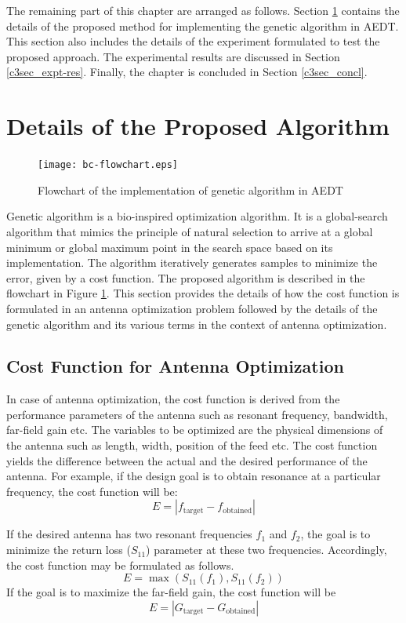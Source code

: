 The remaining part of this chapter are arranged as follows. Section \ref{c3sec-prop-alg} contains the details of the proposed method for implementing the genetic algorithm in AEDT. This section also includes the details of the experiment formulated to test the proposed approach. The experimental results are discussed in Section \ref{c3sec_expt-res}. Finally, the chapter is concluded in Section \ref{c3sec_concl}.

\section{Details of the Proposed Algorithm} \label{c3sec-prop-alg}
\begin{figure}
  \centering
  \texttt{[image: bc-flowchart.eps]}\\
  \caption{Flowchart of the implementation of genetic algorithm in AEDT}\label{fig_3_1}
\end{figure}
Genetic algorithm is a bio-inspired optimization algorithm. It is a global-search algorithm that mimics the principle of natural selection to arrive at a global minimum or global maximum point in the search space based on its implementation. The algorithm iteratively generates samples to minimize the error, given by a cost function. The proposed algorithm is described in the flowchart in Figure \ref{fig_3_1}. This section provides the details of how the cost function is formulated in an antenna optimization problem followed by the details of the genetic algorithm and its various terms in the context of antenna optimization.

\subsection{Cost Function for Antenna Optimization}
In case of antenna optimization, the cost function is derived from the performance parameters of the antenna such as resonant frequency, bandwidth, far-field gain etc. The variables to be optimized are the physical dimensions of the antenna such as length, width, position of the feed etc. The cost function yields the difference between the actual and the desired performance of the antenna. For example, if the design goal is to obtain resonance at a particular frequency, the cost function will be:
\begin{equation}
E = \left|f_{\textrm{target}}-f_{\textrm{obtained}}\right|
\end{equation}

If the desired antenna has two resonant frequencies $f_1$ and $f_2$, the goal is to minimize the return loss ($S_{11}$) parameter at these two frequencies. Accordingly, the cost function may be formulated as follows.
\begin{equation}
E = \max\left(S_{11}(f_1), S_{11}(f_2)\right)
\end{equation}
If the goal is to maximize the far-field gain, the cost function will be
\begin{equation}
E = \left|G_{\textrm{target}}-G_{\textrm{obtained}}\right|
\end{equation}

